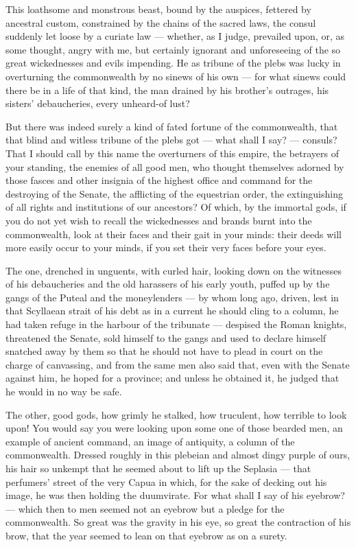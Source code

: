  This loathsome and monstrous beast, bound by the auspices, fettered by ancestral custom, constrained by the chains of the sacred laws, the consul suddenly let loose by a curiate law --- whether, as I judge, prevailed upon, or, as some thought, angry with me, but certainly ignorant and unforeseeing of the so great wickednesses and evils impending. He as tribune of the plebs was lucky in overturning the commonwealth by no sinews of his own --- for what sinews could there be in a life of that kind, the man drained by his brother's outrages, his sisters' debaucheries, every unheard-of lust?

 But there was indeed surely a kind of fated fortune of the commonwealth, that that blind and witless tribune of the plebs got --- what shall I say? --- consuls? That I should call by this name the overturners of this empire, the betrayers of your standing, the enemies of all good men, who thought themselves adorned by those fasces and other insignia of the highest office and command for the destroying of the Senate, the afflicting of the equestrian order, the extinguishing of all rights and institutions of our ancestors? Of which, by the immortal gods, if you do not yet wish to recall the wickednesses and brands burnt into the commonwealth, look at their faces and their gait in your minds: their deeds will more easily occur to your minds, if you set their very faces before your eyes.

 The one, drenched in unguents, with curled hair, looking down on the witnesses of his debaucheries and the old harassers of his early youth, puffed up by the gangs of the Puteal and the moneylenders --- by whom long ago, driven, lest in that Scyllaean strait of his debt as in a current he should cling to a column, he had taken refuge in the harbour of the tribunate --- despised the Roman knights, threatened the Senate, sold himself to the gangs and used to declare himself snatched away by them so that he should not have to plead in court on the charge of canvassing, and from the same men also said that, even with the Senate against him, he hoped for a province; and unless he obtained it, he judged that he would in no way be safe.

 The other, good gods, how grimly he stalked, how truculent, how terrible to look upon! You would say you were looking upon some one of those bearded men, an example of ancient command, an image of antiquity, a column of the commonwealth. Dressed roughly in this plebeian and almost dingy purple of ours, his hair so unkempt that he seemed about to lift up the Seplasia --- that perfumers' street of the very Capua in which, for the sake of decking out his image, he was then holding the duumvirate. For what shall I say of his eyebrow? --- which then to men seemed not an eyebrow but a pledge for the commonwealth. So great was the gravity in his eye, so great the contraction of his brow, that the year seemed to lean on that eyebrow as on a surety.

